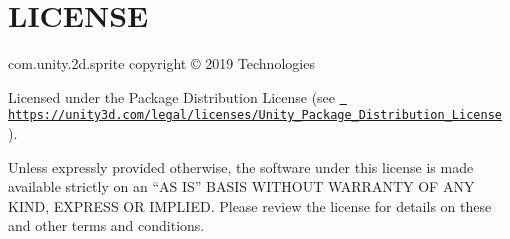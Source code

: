 \chapter{LICENSE}
\hypertarget{md__hey_tea_9_2_library_2_package_cache_2com_8unity_82d_8sprite_0d1_80_80_2_l_i_c_e_n_s_e}{}\label{md__hey_tea_9_2_library_2_package_cache_2com_8unity_82d_8sprite_0d1_80_80_2_l_i_c_e_n_s_e}
com.\+unity.\+2d.\+sprite copyright © 2019  Technologies

Licensed under the  Package Distribution License (see \href{https://unity3d.com/legal/licenses/Unity_Package_Distribution_License}{\texttt{ https\+://unity3d.\+com/legal/licenses/\+Unity\+\_\+\+Package\+\_\+\+Distribution\+\_\+\+License}} ).

Unless expressly provided otherwise, the software under this license is made available strictly on an “\+AS IS” BASIS WITHOUT WARRANTY OF ANY KIND, EXPRESS OR IMPLIED. Please review the license for details on these and other terms and conditions. 